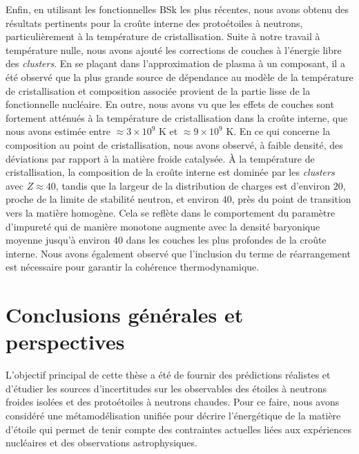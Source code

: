 Enfin, en utilisant les fonctionnelles BSk les plus récentes, nous avons obtenu 
des résultats pertinents pour la croûte interne des protoétoiles à neutrons,
particulièrement à la température de cristallisation. 
%
Suite à notre travail à température nulle, nous avons ajouté 
les corrections de couches à l'énergie libre des \textit{clusters}. En se 
plaçant dans l'approximation de plasma à un composant, il a été observé que 
la plus grande source de dépendance au modèle de la température de 
cristallisation et composition associée provient de la partie lisse de la 
fonctionnelle nucléaire. 
En outre, nous avons vu que les effets de couches sont fortement atténués à la 
température de cristallisation dans la croûte interne, que nous avons estimée 
entre $\approx 3 \times 10^9$ K et $\approx 9 \times 10^9$ K. 
En ce qui concerne la composition au point de cristallisation, nous avons 
observé, à faible densité, des déviations par rapport à la matière froide 
catalysée. 
%
À la température de cristallisation, la composition de la croûte interne est 
dominée par les \textit{clusters} avec $Z\approx 40$, tandis que la 
largeur de la distribution de charges est d'environ $20$, proche de la limite 
de stabilité neutron, et environ $40$, près du point de transition vers la 
matière homogène. 
Cela se reflète dans le comportement du paramètre d'impureté qui de manière 
monotone augmente avec la densité baryonique moyenne jusqu'à environ $40$ dans 
les couches les plus profondes de la croûte interne. 
Nous avons également observé que l'inclusion du terme de réarrangement est 
nécessaire pour garantir la cohérence thermodynamique. 

\section{Conclusions générales et perspectives}

L'objectif principal de cette thèse a été de fournir des prédictions réalistes 
et d'étudier les sources d'incertitudes sur les observables des étoiles à 
neutrons froides isolées et des protoétoiles à neutrons chaudes. Pour ce faire,
nous avons considéré une métamodélisation unifiée pour décrire l'énergétique de 
la matière d'étoile qui permet de tenir compte des contraintes actuelles liées 
aux expériences nucléaires et des observations astrophysiques.
\\

